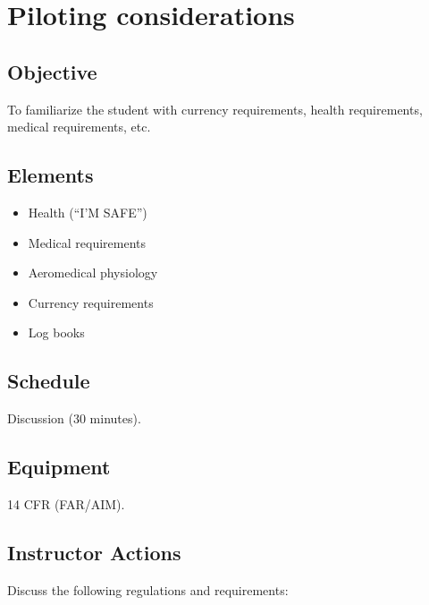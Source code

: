 \section{Piloting considerations}

\subsection{Objective}

To familiarize the student with currency requirements, health requirements,
medical requirements, etc.

\subsection{Elements}

\begin{itemize}
  \item Health (``I'M SAFE'')
  \item Medical requirements
  \item Aeromedical physiology
  \item Currency requirements
  \item Log books
\end{itemize}

\subsection{Schedule}

Discussion (30 minutes).

\subsection{Equipment}

14 CFR (FAR/AIM).

\subsection{Instructor Actions}

Discuss the following regulations and requirements:

